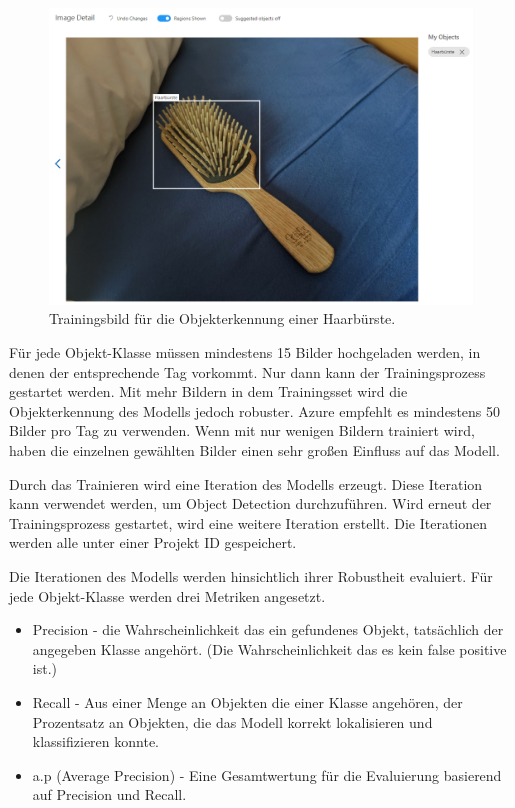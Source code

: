 \begin{figure}[H]
	\centering
	\includegraphics[width=1\textwidth]{images/trainingone.png}
	\caption[Trainingsbild für Azrue Custom Detection]{Trainingsbild für die Objekterkennung einer Haarbürste.}
	\label{img:trainingone}
\end{figure}

Für jede Objekt-Klasse müssen mindestens 15 Bilder hochgeladen werden, in denen der entsprechende Tag vorkommt. Nur dann kann der Trainingsprozess gestartet werden. Mit mehr Bildern in dem Trainingsset wird die Objekterkennung des Modells jedoch robuster. Azure empfehlt es mindestens 50 Bilder pro Tag zu verwenden. Wenn mit nur wenigen Bildern trainiert wird, haben die einzelnen gewählten Bilder einen sehr großen Einfluss auf das Modell.

Durch das Trainieren wird eine Iteration des Modells erzeugt. Diese Iteration kann verwendet werden, um Object Detection durchzuführen. Wird erneut der Trainingsprozess gestartet, wird eine weitere Iteration erstellt. Die Iterationen werden alle unter einer Projekt ID gespeichert.

Die Iterationen des Modells werden hinsichtlich ihrer Robustheit evaluiert. Für jede Objekt-Klasse werden drei Metriken angesetzt. 
\begin{itemize}
	\item Precision - die Wahrscheinlichkeit das ein gefundenes Objekt, tatsächlich der angegeben Klasse angehört. (Die Wahrscheinlichkeit das es kein false positive ist.)
	\item Recall - Aus einer Menge an Objekten die einer Klasse angehören, der Prozentsatz an Objekten, die das Modell korrekt lokalisieren und klassifizieren konnte.
	\item a.p (Average Precision) - Eine Gesamtwertung für die Evaluierung basierend auf Precision und Recall. 
\end{itemize}

